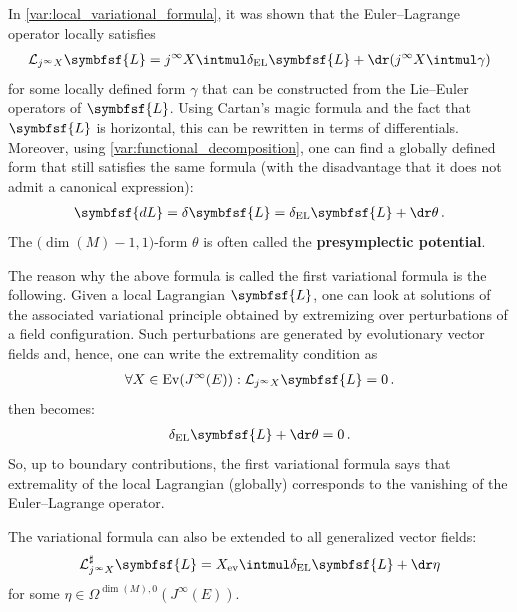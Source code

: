     \begin{property}
        In \cref{var:local_variational_formula}, it was shown that the Euler--Lagrange operator locally satisfies
        \begin{gather}
            \mathcal{L}_{j^\infty X}\symbfsf{L} = j^\infty X\intmul\delta_{\text{EL}}\symbfsf{L} + \dr(j^\infty X\intmul\gamma)
        \end{gather}
        for some locally defined form $\gamma$ that can be constructed from the Lie--Euler operators of $\symbfsf{L}$. Using Cartan's magic formula and the fact that $\symbfsf{L}$ is horizontal, this can be rewritten in terms of differentials. Moreover, using \cref{var:functional_decomposition}, one can find a globally defined form that still satisfies the same formula (with the disadvantage that it does not admit a canonical expression):
        \begin{gather}
            \label{var:first_variational_formula}
            \symbfsf{dL} = \delta\symbfsf{L} = \delta_{\text{EL}}\symbfsf{L} + \dr\theta\,.
        \end{gather}
        The $\bigl(\dim(M)-1,1\bigr)$-form $\theta$ is often called the \textbf{presymplectic potential}.

        The reason why the above formula is called the first variational formula is the following. Given a local Lagrangian $\symbfsf{L}$, one can look at solutions of the associated variational principle obtained by extremizing over perturbations of a field configuration. Such perturbations are generated by evolutionary vector fields and, hence, one can write the extremality condition as
        \begin{gather}
            \forall X\in\mathrm{Ev}(J^\infty(E)):\mathcal{L}_{j^\infty X}\symbfsf{L} = 0\,.
        \end{gather}
         then becomes:
        \begin{gather}
            \delta_\mathrm{EL}\symbfsf{L} + \dr\theta = 0\,.
        \end{gather}
        So, up to boundary contributions, the first variational formula says that extremality of the local Lagrangian (globally) corresponds to the vanishing of the Euler--Lagrange operator.
    \end{property}
    \begin{result}\label{var:general_variational_formula}
        The variational formula can also be extended to all generalized vector fields:
        \begin{gather}
            \mathcal{L}^\sharp_{j^\infty X}\symbfsf{L} = X_{\text{ev}}\intmul\delta_{\text{EL}}\symbfsf{L} + \dr\eta
        \end{gather}
        for some $\eta\in\Omega^{\dim(M),0}(J^\infty(E))$.
    \end{result}

